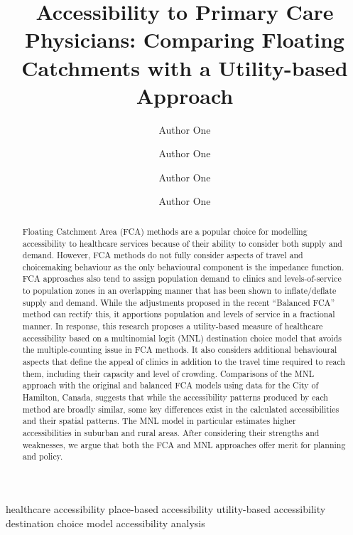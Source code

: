 \documentclass[]{elsarticle} %
\begin{document}
\begin{frontmatter}

  \title{Accessibility to Primary Care Physicians: Comparing Floating
Catchments with a Utility-based Approach}
    \author[Some University]{Author One}
    \author[Some University]{Author One}
    \author[Some University]{Author One}
    \author[Some University]{Author One}
      \address[Some University]{Address}
  
  \begin{abstract}
  Floating Catchment Area (FCA) methods are a popular choice for
  modelling accessibility to healthcare services because of their
  ability to consider both supply and demand. However, FCA methods do
  not fully consider aspects of travel and choicemaking behaviour as the
  only behavioural component is the impedance function. FCA approaches
  also tend to assign population demand to clinics and levels-of-service
  to population zones in an overlapping manner that has been shown to
  inflate/deflate supply and demand. While the adjustments proposed in
  the recent ``Balanced FCA'' method can rectify this, it apportions
  population and levels of service in a fractional manner. In response,
  this research proposes a utility-based measure of healthcare
  accessibility based on a multinomial logit (MNL) destination choice
  model that avoids the multiple-counting issue in FCA methods. It also
  considers additional behavioural aspects that define the appeal of
  clinics in addition to the travel time required to reach them,
  including their capacity and level of crowding. Comparisons of the MNL
  approach with the original and balanced FCA models using data for the
  City of Hamilton, Canada, suggests that while the accessibility
  patterns produced by each method are broadly similar, some key
  differences exist in the calculated accessibilities and their spatial
  patterns. The MNL model in particular estimates higher accessibilities
  in suburban and rural areas. After considering their strengths and
  weaknesses, we argue that both the FCA and MNL approaches offer merit
  for planning and policy.
  \end{abstract}
   \begin{keyword} healthcare accessibility place-based
accessibility utility-based accessibility destination choice
model accessibility analysis\end{keyword}
 \end{frontmatter}
\end{document}
